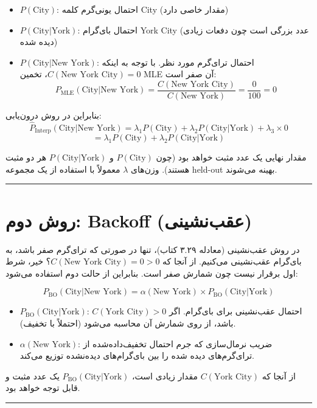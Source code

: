 \documentclass[11pt,a4paper]{article}
\newcommand{\en}[1]{\textenglish{#1}}
\newcommand{\separator}{\vspace{1em}\noindent\rule{\linewidth}{0.4pt}\vspace{1em}}
\begin{document}
\begin{itemize}
\item $P(\text{City})$: احتمال یونی‌گرم کلمه \en{City} (مقدار خاصی دارد)
\item $P(\text{City}|\text{York})$: احتمال بای‌گرام \en{York City} (عدد بزرگی است چون دفعات زیادی دیده شده)
\item $P(\text{City}|\text{New York})$: احتمال ترای‌گرم مورد نظر. با توجه به اینکه $C(\text{New York City}) = 0$، تخمین MLE آن صفر است:
\[
P_{\text{MLE}}(\text{City}|\text{New York}) = \frac{C(\text{New York City})}{C(\text{New York})} = \frac{0}{100} = 0
\]
\end{itemize}

بنابراین در روش درون‌یابی:
\[
\hat{P}_{\text{Interp}}(\text{City}|\text{New York}) = \lambda_1 P(\text{City}) + \lambda_2 P(\text{City}|\text{York}) + \lambda_3 \times 0
\]
\[
= \lambda_1 P(\text{City}) + \lambda_2 P(\text{City}|\text{York})
\]

مقدار نهایی یک عدد مثبت خواهد بود (چون $P(\text{City})$ و $P(\text{City}|\text{York})$ هر دو مثبت هستند). وزن‌های $\lambda$ معمولاً با استفاده از یک مجموعه \en{held-out} بهینه می‌شوند.

\separator
\section{روش دوم: \en{Backoff} (عقب‌نشینی)}
در روش عقب‌نشینی (معادله ۳.۲۹ کتاب)، تنها در صورتی که ترای‌گرم صفر باشد، به بای‌گرام عقب‌نشینی می‌کنیم. از آنجا که $C(\text{New York City}) = 0 > 0$؟ خیر، شرط اول برقرار نیست چون شمارش صفر است. بنابراین از حالت دوم استفاده می‌شود:

\[
P_{\text{BO}}(\text{City}|\text{New York}) = \alpha(\text{New York}) \times P_{\text{BO}}(\text{City}|\text{York})
\]

\begin{itemize}
\item $P_{\text{BO}}(\text{City}|\text{York})$: احتمال عقب‌نشینی برای بای‌گرام. اگر $C(\text{York City}) > 0$ باشد، از روی شمارش آن محاسبه می‌شود (احتملاً با تخفیف).
\item $\alpha(\text{New York})$: ضریب نرمال‌سازی که جرم احتمال تخفیف‌داده‌شده از ترای‌گرم‌های دیده شده را بین بای‌گرام‌های دیده‌نشده توزیع می‌کند.
\end{itemize}

از آنجا که $C(\text{York City})$ مقدار زیادی است، $P_{\text{BO}}(\text{City}|\text{York})$ یک عدد مثبت و قابل توجه خواهد بود.

\separator
\end{document}
